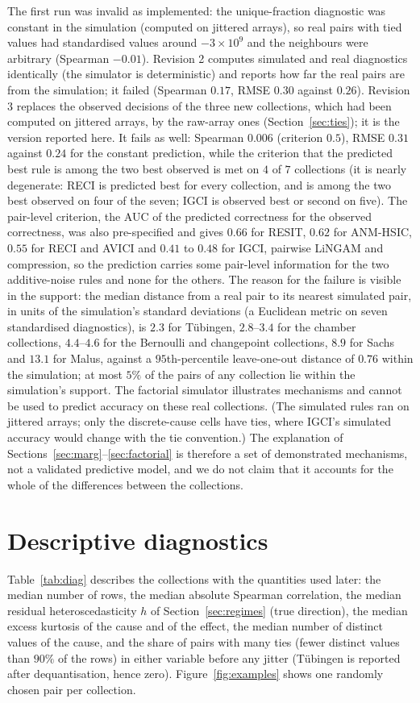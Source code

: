 The first run was invalid as implemented: the unique-fraction diagnostic was constant in the simulation (computed on jittered arrays), so real pairs with tied values had standardised values around $-3\times10^{9}$ and the neighbours were arbitrary (Spearman $-0.01$). Revision 2 computes simulated and real diagnostics identically (the simulator is deterministic) and reports how far the real pairs are from the simulation; it failed (Spearman $0.17$, RMSE $0.30$ against $0.26$). Revision 3 replaces the observed decisions of the three new collections, which had been computed on jittered arrays, by the raw-array ones (Section~\ref{sec:ties}); it is the version reported here. It fails as well: Spearman $0.006$ (criterion $0.5$), RMSE $0.31$ against $0.24$ for the constant prediction, while the criterion that the predicted best rule is among the two best observed is met on $4$ of $7$ collections (it is nearly degenerate: RECI is predicted best for every collection, and is among the two best observed on four of the seven; IGCI is observed best or second on five). The pair-level criterion, the AUC of the predicted correctness for the observed correctness, was also pre-specified and gives $0.66$ for RESIT, $0.62$ for ANM-HSIC, $0.55$ for RECI and AVICI and $0.41$ to $0.48$ for IGCI, pairwise LiNGAM and compression, so the prediction carries some pair-level information for the two additive-noise rules and none for the others. The reason for the failure is visible in the support: the median distance from a real pair to its nearest simulated pair, in units of the simulation's standard deviations (a Euclidean metric on seven standardised diagnostics), is $2.3$ for T\"ubingen, $2.8$--$3.4$ for the chamber collections, $4.4$--$4.6$ for the Bernoulli and changepoint collections, $8.9$ for Sachs and $13.1$ for Malus, against a $95$th-percentile leave-one-out distance of $0.76$ within the simulation; at most $5\%$ of the pairs of any collection lie within the simulation's support. The factorial simulator illustrates mechanisms and cannot be used to predict accuracy on these real collections. (The simulated rules ran on jittered arrays; only the discrete-cause cells have ties, where IGCI's simulated accuracy would change with the tie convention.) The explanation of Sections~\ref{sec:marg}--\ref{sec:factorial} is therefore a set of demonstrated mechanisms, not a validated predictive model, and we do not claim that it accounts for the whole of the differences between the collections.

\section{Descriptive diagnostics}
Table~\ref{tab:diag} describes the collections with the quantities used later: the median number of rows, the median absolute Spearman correlation, the median residual heteroscedasticity $h$ of Section~\ref{sec:regimes} (true direction), the median excess kurtosis of the cause and of the effect, the median number of distinct values of the cause, and the share of pairs with many ties (fewer distinct values than $90\%$ of the rows) in either variable before any jitter (T\"ubingen is reported after dequantisation, hence zero). Figure~\ref{fig:examples} shows one randomly chosen pair per collection.

